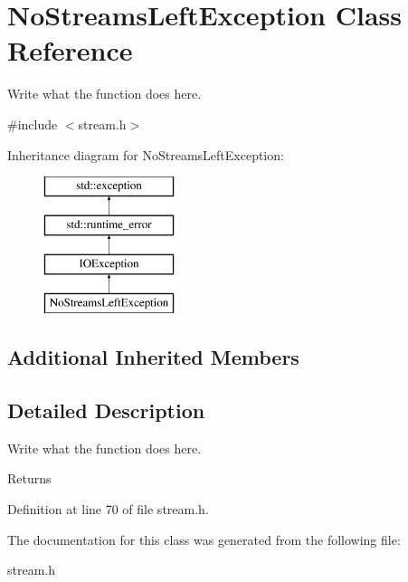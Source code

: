 \hypertarget{classNoStreamsLeftException}{\section{No\+Streams\+Left\+Exception Class Reference}
\label{classNoStreamsLeftException}
}


Write what the function does here.  




{\ttfamily \#include $<$stream.\+h$>$}

Inheritance diagram for No\+Streams\+Left\+Exception\+:\begin{figure}[H]
\begin{center}
\leavevmode
\includegraphics[height=4.000000cm]{classNoStreamsLeftException}
\end{center}
\end{figure}
\subsection*{Additional Inherited Members}


\subsection{Detailed Description}
Write what the function does here. 

\begin{DoxyReturn}{Returns}

\end{DoxyReturn}


Definition at line 70 of file stream.\+h.



The documentation for this class was generated from the following file\+:\begin{DoxyCompactItemize}
\item 
stream.\+h\end{DoxyCompactItemize}
